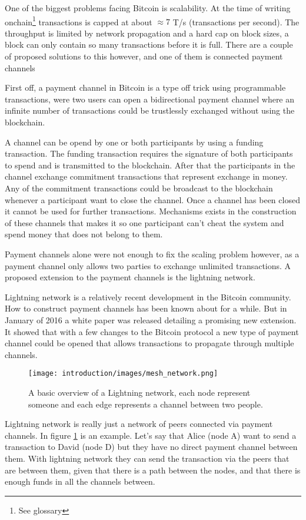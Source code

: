 
One of the biggest problems facing Bitcoin is scalability. At the time of writing
onchain\footnote{See glossary} transactions is capped at about $\approx 7$ T/s (transactions per second).\cite{scaling}
The throughput is limited by network propagation and a hard cap on block sizes, a block
can only contain so many transactions before it is full. There are a couple of
proposed solutions to this however, and one of them is connected payment channels

First off, a payment channel in Bitcoin is a type off trick using programmable transactions, 
were two users can open a bidirectional payment channel where an infinite number of transactions 
could be trustlessly exchanged without using the blockchain. 

A channel can be opend by one or both participants by using a funding transaction. The funding 
transaction requires the signature of both participants to spend and is transmitted to the blockchain. 
After that the participants in the channel exchange commitment transactions that represent exchange in money.
Any of the commitment transactions could be broadcast to the blockchain whenever a participant 
want to close the channel. Once a channel has been closed it cannot be used for further transactions.
Mechanisms exists in the construction of these channels that makes it so one participant 
can't cheat the system and spend money that does not belong to them.

Payment channels alone were not enough to fix the scaling problem however, as a payment channel 
only allows two parties to exchange unlimited transactions. A proposed extension to the 
payment channels is the lightning network.

Lightning network is a relatively recent development in the Bitcoin community.
How to construct payment channels has been known about for a while. But in
January of 2016 a white paper was released detailing a promising new extension.\cite{lightningnetwork_2019}
It showed that with a few changes to the Bitcoin protocol a new type of
payment channel could be opened that allows transactions to propagate through multiple channels.\cite{lightningnetwork_2019}

\begin{figure}[H]
	\centering
	\texttt{[image: introduction/images/mesh\_network.png]}
	\caption{A basic overview of a Lightning network, each node represent someone
	and each edge represents a channel between two people.}
	\label{fig:mesh}
\end{figure}

Lightning network is really just a network of peers connected via payment channels. In figure \ref{fig:mesh} is an example. Let's say that Alice (node A) want to send a transaction to David (node D) but they have no direct payment channel between them. With lightning network they can send the transaction via the peers that are between them, given that there is a path between the nodes, and that there is enough funds in all the channels between. 